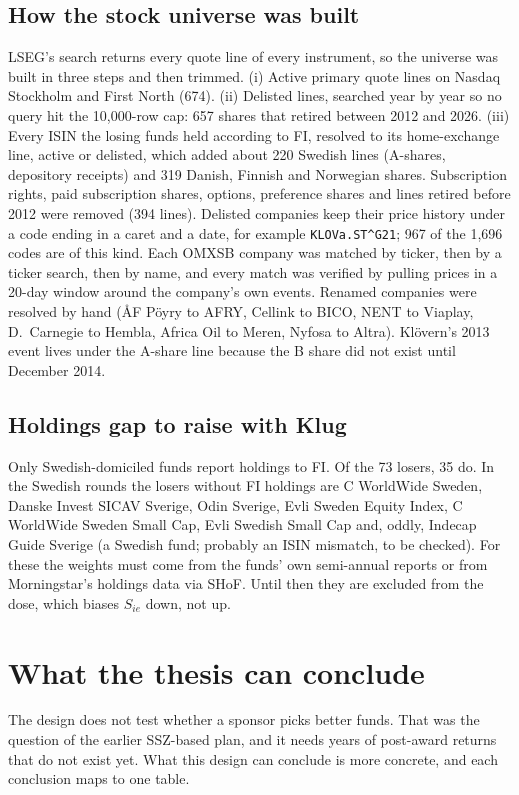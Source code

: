 \documentclass[11pt,a4paper]{article}
\begin{document}
\subsection*{How the stock universe was built}
LSEG's search returns every quote line of every instrument, so the universe was built in three steps and then trimmed. (i) Active primary quote lines on Nasdaq Stockholm and First North (674). (ii) Delisted lines, searched year by year so no query hit the 10,000-row cap: 657 shares that retired between 2012 and 2026. (iii) Every ISIN the losing funds held according to FI, resolved to its home-exchange line, active or delisted, which added about 220 Swedish lines (A-shares, depository receipts) and 319 Danish, Finnish and Norwegian shares. Subscription rights, paid subscription shares, options, preference shares and lines retired before 2012 were removed (394 lines). Delisted companies keep their price history under a code ending in a caret and a date, for example \texttt{KLOVa.ST\textasciicircum G21}; 967 of the 1,696 codes are of this kind. Each OMXSB company was matched by ticker, then by a ticker search, then by name, and every match was verified by pulling prices in a 20-day window around the company's own events. Renamed companies were resolved by hand (ÅF Pöyry to AFRY, Cellink to BICO, NENT to Viaplay, D.\ Carnegie to Hembla, Africa Oil to Meren, Nyfosa to Altra). Klövern's 2013 event lives under the A-share line because the B share did not exist until December 2014.

\subsection*{Holdings gap to raise with Klug}
Only Swedish-domiciled funds report holdings to FI. Of the 73 losers, 35 do. In the Swedish rounds the losers without FI holdings are C WorldWide Sweden, Danske Invest SICAV Sverige, Odin Sverige, Evli Sweden Equity Index, C WorldWide Sweden Small Cap, Evli Swedish Small Cap and, oddly, Indecap Guide Sverige (a Swedish fund; probably an ISIN mismatch, to be checked). For these the weights must come from the funds' own semi-annual reports or from Morningstar's holdings data via SHoF. Until then they are excluded from the dose, which biases $S_{ie}$ down, not up.

\section{What the thesis can conclude}

The design does not test whether a sponsor picks better funds. That was the question of the earlier SSZ-based plan, and it needs years of post-award returns that do not exist yet. What this design can conclude is more concrete, and each conclusion maps to one table.
\end{document}
